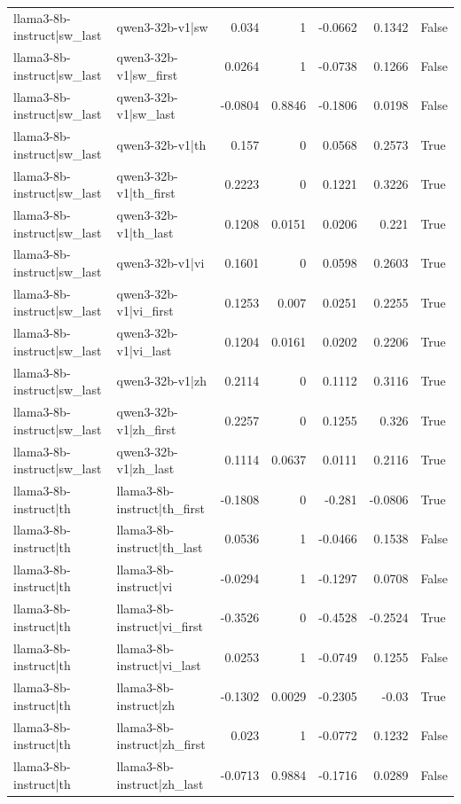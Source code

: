 \begin{table}
\begin{tabular}{l l r r r r l}
llama3-8b-instruct|sw_last & qwen3-32b-v1|sw & 0.034 & 1 & -0.0662 & 0.1342 & False \\
llama3-8b-instruct|sw_last & qwen3-32b-v1|sw_first & 0.0264 & 1 & -0.0738 & 0.1266 & False \\
llama3-8b-instruct|sw_last & qwen3-32b-v1|sw_last & -0.0804 & 0.8846 & -0.1806 & 0.0198 & False \\
llama3-8b-instruct|sw_last & qwen3-32b-v1|th & 0.157 & 0 & 0.0568 & 0.2573 & True \\
llama3-8b-instruct|sw_last & qwen3-32b-v1|th_first & 0.2223 & 0 & 0.1221 & 0.3226 & True \\
llama3-8b-instruct|sw_last & qwen3-32b-v1|th_last & 0.1208 & 0.0151 & 0.0206 & 0.221 & True \\
llama3-8b-instruct|sw_last & qwen3-32b-v1|vi & 0.1601 & 0 & 0.0598 & 0.2603 & True \\
llama3-8b-instruct|sw_last & qwen3-32b-v1|vi_first & 0.1253 & 0.007 & 0.0251 & 0.2255 & True \\
llama3-8b-instruct|sw_last & qwen3-32b-v1|vi_last & 0.1204 & 0.0161 & 0.0202 & 0.2206 & True \\
llama3-8b-instruct|sw_last & qwen3-32b-v1|zh & 0.2114 & 0 & 0.1112 & 0.3116 & True \\
llama3-8b-instruct|sw_last & qwen3-32b-v1|zh_first & 0.2257 & 0 & 0.1255 & 0.326 & True \\
llama3-8b-instruct|sw_last & qwen3-32b-v1|zh_last & 0.1114 & 0.0637 & 0.0111 & 0.2116 & True \\
llama3-8b-instruct|th & llama3-8b-instruct|th_first & -0.1808 & 0 & -0.281 & -0.0806 & True \\
llama3-8b-instruct|th & llama3-8b-instruct|th_last & 0.0536 & 1 & -0.0466 & 0.1538 & False \\
llama3-8b-instruct|th & llama3-8b-instruct|vi & -0.0294 & 1 & -0.1297 & 0.0708 & False \\
llama3-8b-instruct|th & llama3-8b-instruct|vi_first & -0.3526 & 0 & -0.4528 & -0.2524 & True \\
llama3-8b-instruct|th & llama3-8b-instruct|vi_last & 0.0253 & 1 & -0.0749 & 0.1255 & False \\
llama3-8b-instruct|th & llama3-8b-instruct|zh & -0.1302 & 0.0029 & -0.2305 & -0.03 & True \\
llama3-8b-instruct|th & llama3-8b-instruct|zh_first & 0.023 & 1 & -0.0772 & 0.1232 & False \\
llama3-8b-instruct|th & llama3-8b-instruct|zh_last & -0.0713 & 0.9884 & -0.1716 & 0.0289 & False \\

\end{tabular}
\end{table}
